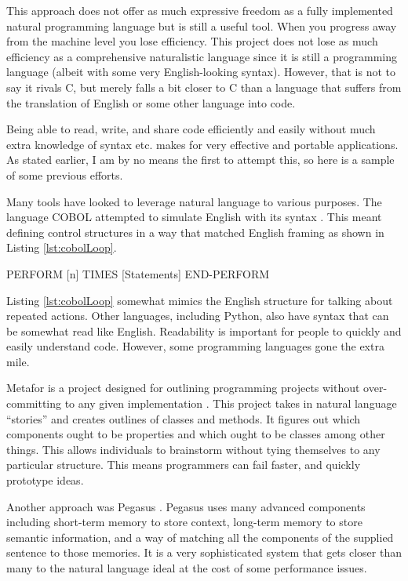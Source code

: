 \documentclass[titlepage]{article}
\newcommand{\lstRef}[1]{Listing \ref{lst:#1}}
\begin{document}
This approach does not offer as much expressive freedom as a fully implemented natural programming language but is still a useful tool. When you progress away from the machine level you lose efficiency. This project does not lose as much efficiency as a comprehensive naturalistic language since it is still a programming language (albeit with some very English-looking syntax). However, that is not to say it rivals C, but merely falls a bit closer to C than a language that suffers from the translation of English or some other language into code.

Being able to read, write, and share code efficiently and easily without much extra knowledge of syntax etc. makes for very effective and portable applications. As stated earlier, I am by no means the first to attempt this, so here is a sample of some previous efforts.

Many tools have looked to leverage natural language to various purposes. The language COBOL attempted to simulate English with its syntax \cite{Liu2005MetaforVS}. This meant defining control structures in a way that matched English framing as shown in \lstRef{cobolLoop}.

\begin{codeblock}[language=Cobol,caption={Cobol Loop Frame},label={lst:cobolLoop}]
PERFORM [n] TIMES
	[Statements]
END-PERFORM
\end{codeblock}

\lstRef{cobolLoop} somewhat mimics the English structure for talking about repeated actions. Other languages, including Python, also have syntax that can be somewhat read like English. Readability is important for people to quickly and easily understand code. However, some programming languages gone the extra mile.

Metafor is a project designed for outlining programming projects without over-committing to any given implementation \cite{Liu2005MetaforVS}. This project takes in natural language “stories” and creates outlines of classes and methods. It figures out which components ought to be properties and which ought to be classes among other things. This allows individuals to brainstorm without tying themselves to any particular structure. This means programmers can fail faster, and quickly prototype ideas.

Another approach was Pegasus \cite{Knöll2006PegasusFS}. Pegasus uses many advanced components including short-term memory to store context, long-term memory to store semantic information, and a way of matching all the components of the supplied sentence to those memories. It is a very sophisticated system that gets closer than many to the natural language ideal at the cost of some performance issues.
\end{document}
